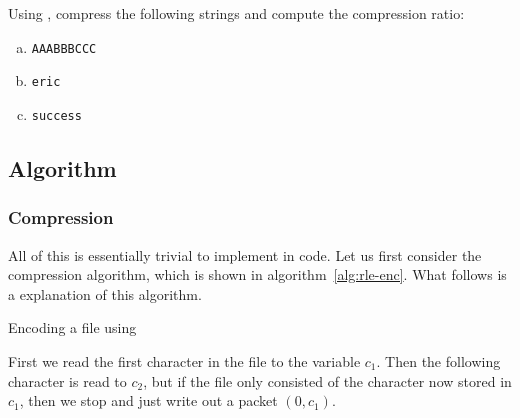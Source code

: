 \begin{Exercise}[label={rle-compression}]
  Using \rle, compress the following strings and compute the
  compression ratio:

  \begin{enumerate}[(a)]
  \item \texttt{AAABBBCCC}
  \item \texttt{eric}
  \item \texttt{success}
  \end{enumerate}

\end{Exercise}

\subsection{Algorithm}

\subsubsection{Compression}

All of this is essentially trivial to implement in code. Let us first
consider the compression algorithm, which is shown in
algorithm~\ref{alg:rle-enc}. What follows is a explanation of this
algorithm.

\begin{algorithm}
  \caption{Encoding a file using \rle}
  \label{alg:rle-enc}
  \begin{algorithmic}[1]


    \While{\True}


    \If{\eof}
    \Break
    \EndIf

    \Else
    \State {}
    \State {}

    \EndIf

    \EndWhile

    \State {}
    \State {}
  \end{algorithmic}
\end{algorithm}

First we read the first character in the file to the variable
$c_1$. Then the following character is read to $c_2$, but if the file
only consisted of the character now stored in $c_1$, then we stop and
just write out a packet $(0,c_1)$.


